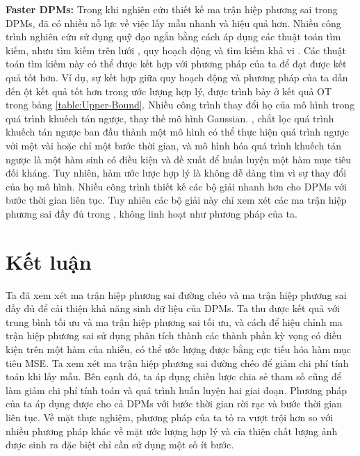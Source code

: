 \documentclass[14pt, a4paper]{article}
\numberwithin{equation}{section}
\numberwithin{figure}{section}
\numberwithin{dl}{section}
\numberwithin{md}{section}
\numberwithin{bd}{section}
\numberwithin{dn}{section}
\numberwithin{hq}{section}
\begin{document}
    \textbf{Faster DPMs:} Trong khi nghiên cứu thiết kế ma trận hiệp phương sai trong DPMs, đã có nhiều nỗ lực về việc lấy mẫu nhanh và hiệu quả hơn.
    Nhiều công trình nghiên cứu sử dụng quỹ đạo ngắn bằng cách áp dụng các thuật toán tìm kiếm, nhưu tìm kiếm trên lưới \cite{chen2020wavegrad},
    quy hoạch động \cite{watson2021learning} và tìm kiếm khả vi \cite{watson2021fastsampler}.
    Các thuật toán tìm kiếm này có thể được kết hợp với phương pháp của ta để đạt được kết quả tốt hơn.
    Ví dụ, sự kết hợp giữa quy hoạch động và phương pháp của ta dẫn đến ột kết quả tốt hơn trong ước lượng hợp lý, được trình bày ở kết quả OT trong bảng \ref{table:Upper-Bound}.
    Nhiều công trình thay đổi họ của mô hình trong quá trình khuếch tán ngược, thay thế mô hình Gaussian.
    \cite{luhman2021knowledge}, \cite{salimans2021progressive} chắt lọc quá trình khuếch tán ngược ban đầu thành một mô hình có thể thực hiện quá trình ngược với một vài hoặc chỉ một bước thời gian,
    và \cite{xiao2021tackling} mô hình hóa quá trình khuếch tán ngược là một hàm sinh có điều kiện và đề xuất để huấn luyện một hàm mục tiêu đối kháng.
    Tuy nhiên, hàm ước lược hợp lý là không dễ dàng tìm vì sự thay đổi của họ mô hình.
    Nhiều công trình thiết kế các bộ giải nhanh hơn \cite{jolicoeur2021gotta,popov2021diffusion} cho DPMs với bước thời gian liên tục.
    Tuy nhiên các bộ giải này chỉ xem xét các ma trận hiệp phương sai đầy đủ trong \cite{ho2020denoising}, \cite{bao2021analytic} không linh hoạt như phương pháp của ta.

    \section{Kết luận}

    Ta đã xem xét ma trận hiệp phương sai đường chéo và ma trận hiệp phương sai đầy đủ để cải thiện khả năng sinh dữ liệu của DPMs.
    Ta thu được kết quả với trung bình tối ưu và ma trận hiệp phương sai tối ưu, và cách để hiệu chỉnh ma trận hiệp phương sai sử dụng phân tích thành các thành phần kỳ vọng có điều kiện trên một hàm của nhiễu,
    có thể ước lượng được bằng cực tiếu hóa hàm mục tiêu MSE. Ta xem xét ma trận hiệp phương sai đường chéo để giảm chi phí tính toán khi lấy mẫu.
    Bên cạnh đó, ta áp dụng chiến lược chia sẻ tham số cũng để làm giảm chi phí tính toán và quá trình huấn luyện hai giai đoạn.
    Phương pháp của ta áp dụng được cho cả DPMs với bước thời gian rời rạc và bước thời gian liên tục.
    Về mặt thực nghiệm, phương pháp của ta tỏ ra vượt trội hơn so với nhiều phương pháp khác về mặt ước lượng hợp lý và cỉa thiện chất lượng ảnh được sinh ra đặc biệt chỉ cần sử dụng một số ít bước.
\end{document}
